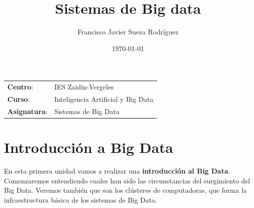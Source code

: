 


\title{
\vspace{10ex}
\normalfont \normalsize
\huge \textbf{Sistemas de Big data}
}
\author{Francisco Javier Sueza Rodríguez}
\date{\normalsize\today}

\glsenablehyper
\makeglossaries
{}




\maketitle

\thispagestyle{empty}

\vspace{75ex}

\begin{center}
    \begin{tabular}{l l}
        \textbf{Centro}: & IES Zaidin-Vergeles \\
        \textbf{Curso}: & Inteligencia Artificial y Big Data\\
        \textbf{Asignatura}: & Sistemas de Big Data\
    \end{tabular}
\end{center}

\newpage

\begingroup
\hypersetup{linkcolor=black}
\tableofcontents
\endgroup

\newpage

\begingroup
\hypersetup{linkcolor=black}
\listoffigures
\listoftables
\endgroup

\newpage

\section{Introducción a Big Data}
En esta primera unidad vamos a realizar una \textbf{introducción al Big Data}. Comenzaremos entendiendo cuales han sido las circunstancias del surgimiento del Big Data. Veremos también que son los clústeres de computadoras, que forma la infraestructura básica de los sistemas de Big Data. 

